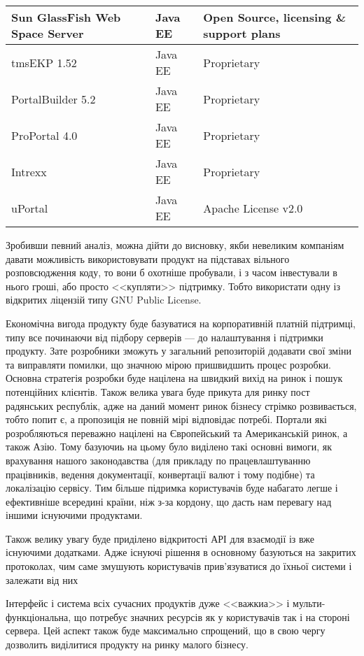 \begin{center}
\begin{longtable}{|
p{}|
p{}|
p{}|}
 Sun GlassFish Web Space Server  & Java EE & Open Source, licensing \& support plans \\ \hline
 tmsEKP 1.52 & Java EE & Proprietary \\ \hline
 PortalBuilder 5.2 & Java EE & Proprietary \\ \hline
 ProPortal 4.0 & Java EE & Proprietary \\ \hline
 Intrexx & Java EE & Proprietary \\ \hline
 uPortal & Java EE & Apache License v2.0 \\ \hline

\end{longtable}
\end{center}


Зробивши певний аналіз, можна дійти до висновку, якби невеликим компаніям давати можливість використовувати продукт на підставах вільного розповсюдження коду, то вони б охотніше пробували, і з часом інвестували в нього гроші, або просто <<купляти>> підтримку.
Тобто використати одну із відкритих ліцензій типу GNU Public License.
\par Економічна вигода продукту буде базуватися на корпоративній платній підтримці, типу все починаючи від підбору серверів --- до налаштування і підтримки продукту.
Зате розробники зможуть у загальний репозиторій додавати свої зміни та виправляти помилки, що значною мірою пришвидшить процес розробки.
Основна стратегія розробки буде націлена на швидкий вихід на ринок і пошук потенційних клієнтів.
Також велика увага буде прикута для ринку пост радянських республік, адже на даний момент ринок бізнесу стрімко розвивається, тобто попит є, а пропозиція не повній мірі відповідає потребі.
Портали які розробляються переважно націлені на Європейський та Американській ринок, а також Азію.
Тому базуючиь на цьому було виділено такі основні вимоги, як врахування нашого законодавства (для прикладу по працевлаштуванню працівників, ведення документації, конвертації валют і тому подібне) та локалізацію сервісу.
Тим більше підримка користувачів буде набагато легше і ефективніше всередині країни, ніж з-за кордону, що дасть нам перевагу над іншими існуючими продуктами.

\par Також велику увагу буде приділено відкритості АРІ для взаємодії із вже існуючими додатками.
Адже існуючі рішення в основному базуються на закритих протоколах, чим саме змушують користувачів прив'язуватися до їхньої системи і залежати від них
\par Інтерфейс і система всіх сучасних продуктів дуже <<важкиа>> і мульти-функціональна, що потребує значних ресурсів як у користувачів так і на стороні сервера.
Цей аспект також буде максимально спрощений, що в свою чергу дозволить виділитися продукту на ринку малого бізнесу.

